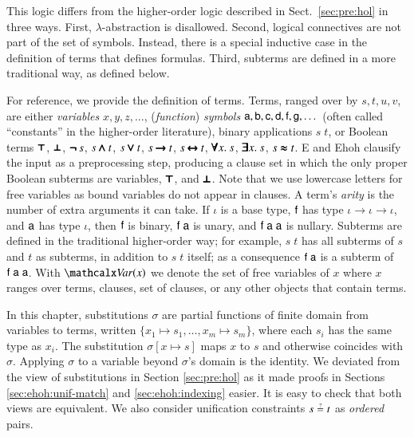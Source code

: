 This logic differs from the higher-order logic described in
Sect.~\ref{sec:pre:hol} in three ways. First, $\lambda$-abstraction is disallowed.
Second, logical connectives are not part of the set of symbols. Instead, there
is a special inductive case in the definition of terms that defines formulas.
Third, subterms are defined in a more traditional way, as defined below. 

For reference, we provide the definition of terms. Terms, ranged over by $s,t,u,v$, are either
\emph{variables} $x, y, z, \dots$, (\emph{function}) \emph{symbols} $\mathsf{a},
\mathsf{b}, \mathsf{c}, \mathsf{d},\allowbreak \mathsf{f},\allowbreak \mathsf{g}, \ldots{}$
(often called ``constants'' in the higher-order literature), binary applications
$s \; t$, or Boolean terms $\pmb\top$, $\pmb\bot$, $\pmb{\neg\,} s$, $s \mathbin{\pmb\land}
t$, $s \mathbin{\pmb\lor} t$, $s \mathbin{\pmb\rightarrow} t$, $s \mathbin{\pmb\leftrightarrow} t$,
$\pmb\forall x.\> s$, $\pmb\exists x.\> s$, $s \mathrel{\pmb\approx} t$. E and Ehoh clausify
the input as a preprocessing step, producing a clause set in which the only
proper Boolean subterms are variables, $\pmb\top$, and $\pmb\bot$. Note that we use
lowercase letters for free variables as bound variables do not appear in
clauses. A term's \emph{arity} is the number of extra arguments it can take. If
$\iota$ is a base type, $\mathsf{f}$ has type $\iota \to \iota \to \iota$, and
$\mathsf{a}$ has type $\iota$, then $\mathsf{f}$ is binary, $\mathsf{f}\;\mathsf{a}$ is
unary, and $\mathsf{f}\;\mathsf{a}\;\mathsf{a}$ is nullary. Subterms are defined in the
traditional higher-order way; for example, $s \; t$ has all subterms of $s$ and
$t$ as subterms, in addition to $s \; t$ itself; as a consequence
$\mathsf{f} \; \mathsf{a}$ is a subterm of $\mathsf{f} \; \mathsf{a} \;\mathsf{a}$. With $\Var(x)$
we denote the set of free variables of $x$ where $x$ ranges over terms, clauses,
set of clauses, or any other objects that contain terms.


In this chapter, substitutions $\sigma$ are partial
functions of finite domain from variables to terms, written $\{ x_1 \mapsto s_1,
\ldots, x_m \mapsto s_m \}$, where each $s_i$ has the same type as $x_i$. The
substitution $\sigma[x \mapsto s]$ maps $x$ to $s$ and otherwise coincides with
$\sigma$. Applying $\sigma$ to a variable beyond $\sigma$'s domain is the
identity. We deviated from the view of substitutions in Section \ref{sec:pre:hol}
as it made proofs in Sections \ref{sec:ehoh:unif-match} and \ref{sec:ehoh:indexing}
easier. It is easy to check that both views are equivalent. We also consider unification 
constraints $s \unif t$ as \emph{ordered} pairs.

